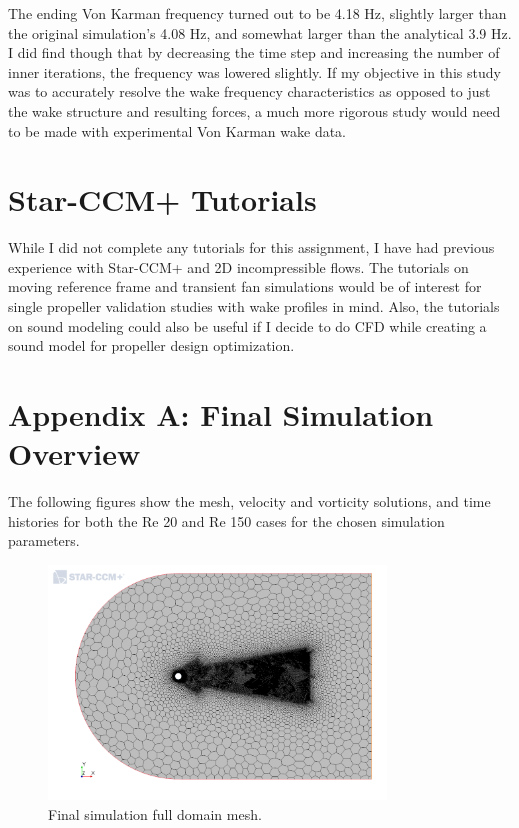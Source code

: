 \documentclass[10pt,english]{article}
\begin{document}
The ending Von Karman frequency turned out to be 4.18 Hz, slightly larger than the original simulation's 4.08 Hz, and somewhat larger than the analytical 3.9 Hz.  I did find though that by decreasing the time step and increasing the number of inner iterations, the frequency was lowered slightly.  If my objective in this study was to accurately resolve the wake frequency characteristics as opposed to just the wake structure and resulting forces, a much more rigorous study would need to be made with experimental Von Karman wake data.

\section{Star-CCM+ Tutorials}

   While I did not complete any tutorials for this assignment, I have had previous experience with Star-CCM+ and 2D incompressible flows.  The tutorials on moving reference frame and transient fan simulations would be of interest for single propeller validation studies with wake profiles in mind.  Also, the tutorials on sound modeling could also be useful if I decide to do CFD while creating a sound model for propeller design optimization.  

\section{Appendix A: Final Simulation Overview}

The following figures show the mesh, velocity and vorticity solutions, and time histories for both the Re 20 and Re 150 cases for the chosen simulation parameters.

 \begin{figure}[h]
\centering
\includegraphics[trim={0.0cm 0cm 0.0cm 0cm},clip,width=0.8\textwidth]{cylinder_2_016_MeshScene2.png}
\vspace{-5pt}
\caption{Final simulation full domain mesh. }
\label{f:cylinder_2_016_MeshScene2}
\end{figure}
\end{document}
